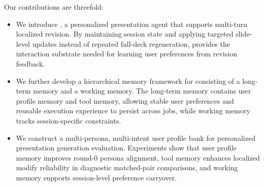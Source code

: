 Our contributions are threefold:
\begingroup
\setlength{\parskip}{0pt}
\setlength{\topsep}{2pt}
\setlength{\partopsep}{0pt}
\setlength{\itemsep}{1pt}
\setlength{\parsep}{0pt}
\begin{itemize}
    \item We introduce \methodname, a personalized presentation agent that
    supports multi-turn localized revision. By maintaining session state and
    applying targeted slide-level updates instead of repeated full-deck
    regeneration, \methodname provides the interaction substrate needed for
    learning user preferences from revision feedback.
    \item We further develop a hierarchical memory framework for \methodname consisting of
    a long-term memory and a working memory. 
    The long-term memory contains user profile memory and tool memory, allowing
    stable user preferences and reusable execution experience to persist across
    jobs, while working memory tracks session-specific constraints.
    \item We construct a multi-persona, multi-intent
    user profile bank for personalized presentation generation evaluation.
    Experiments show that user profile memory improves round-0 persona
    alignment, tool memory enhances localized modify reliability in diagnostic
    matched-pair comparisons, and working memory supports
    session-level preference carryover.
\end{itemize}
\endgroup
